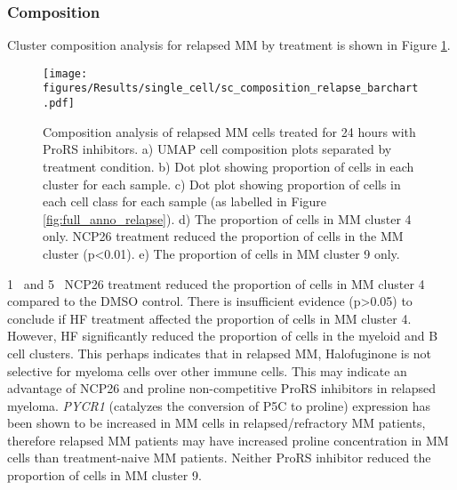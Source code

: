 \subsubsection{Composition}
Cluster composition analysis for relapsed MM by treatment is shown in Figure \ref{fig:composition_relapse}.
\begin{figure}[htb]
\centering
\texttt{[image: figures/Results/single\_cell/sc\_composition\_relapse\_barchart.pdf]}
\caption[Composition analysis- relapsed MM]{Composition analysis of relapsed MM cells treated for 24 hours with ProRS inhibitors.
    a) UMAP cell composition plots separated by treatment condition.
    b) Dot plot showing proportion of cells in each cluster for each sample.
    c) Dot plot showing proportion of cells in each cell class for each sample (as labelled in Figure \ref{fig:full_anno_relapse}).
    d) The proportion of cells in MM cluster 4 only.
NCP26 treatment reduced the proportion of cells in the MM cluster (p<0.01).
    e) The proportion of cells in MM cluster 9 only.}
\label{fig:composition_relapse}
\end{figure}
1\si{\micro\Molar} and 5\si{\micro\Molar} NCP26 treatment reduced the proportion of cells in MM cluster 4 compared to the DMSO control.
There is insufficient evidence (p>0.05) to conclude if HF treatment affected the proportion of cells in MM cluster 4.
However, HF significantly reduced the proportion of cells in the myeloid and B cell clusters.
This perhaps indicates that in relapsed MM, Halofuginone is not selective for myeloma cells over other immune cells.
This may indicate an advantage of NCP26 and proline non-competitive ProRS inhibitors in relapsed myeloma.
\textit{PYCR1} (catalyzes the conversion of P5C to proline) expression has been shown to be increased in MM cells in relapsed/refractory MM patients\cite{oudaert2022pyrroline}, therefore relapsed MM patients may have increased proline concentration in MM cells than treatment-naive MM patients.
Neither ProRS inhibitor reduced the proportion of cells in MM cluster 9.

